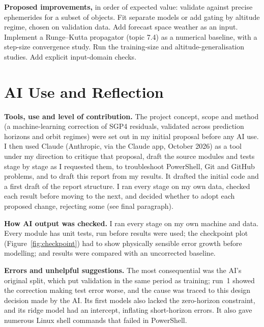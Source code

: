 \documentclass[11pt, a4paper]{article}
\begin{document}
\textbf{Proposed improvements,} in order of expected value: validate against precise ephemerides for a subset of objects. Fit separate models or add gating by altitude regime, chosen on validation data. Add forecast space weather as an input. Implement a Runge--Kutta propagator (topic 7.4) as a numerical baseline, with a step-size convergence study. Run the training-size and altitude-generalisation studies. Add explicit input-domain checks.

\section{AI Use and Reflection}\label{sec:ai}

\textbf{Tools, use and level of contribution.} The project concept, scope and method (a machine-learning correction of SGP4 residuals, validated across prediction horizons and orbit regimes) were set out in my initial proposal before any AI use. I then used Claude (Anthropic, via the Claude app, October 2026) as a tool under my direction to critique that proposal, draft the source modules and tests stage by stage as I requested them, to troubleshoot PowerShell, Git and GitHub problems, and to draft this report from my results. It drafted the initial code and a first draft of the report structure. I ran every stage on my own data, checked each result before moving to the next, and decided whether to adopt each proposed change, rejecting some (see final paragraph).

\textbf{How AI output was checked.} I ran every stage on my own machine and data. Every module has unit tests, run before results were used; the checkpoint plot (Figure~\ref{fig:checkpoint}) had to show physically sensible error growth before modelling; and results were compared with an uncorrected baseline.

\textbf{Errors and unhelpful suggestions.} The most consequential was the AI's original split, which put validation in the same period as training; run~1 showed the correction making test error worse, and the cause was traced to this design decision made by the AI. Its first models also lacked the zero-horizon constraint, and its ridge model had an intercept, inflating short-horizon errors. It also gave numerous Linux shell commands that failed in PowerShell.
\end{document}
